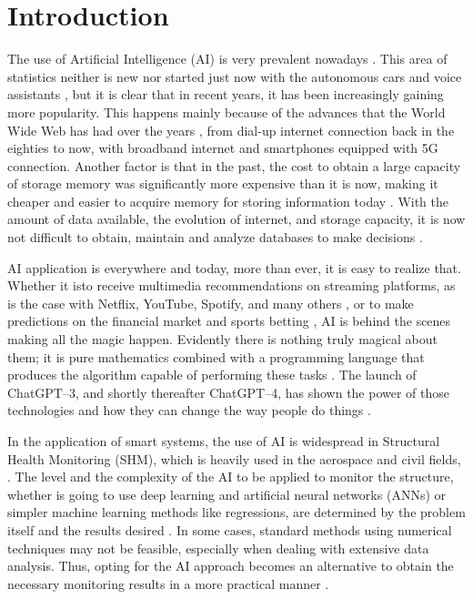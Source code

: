 \chapter{Introduction}

The use of Artificial Intelligence (AI) is very prevalent nowadays \cite{lee2020,poola2017,rabunal2006}. 
This area of statistics neither is new nor started just now with the autonomous cars and voice assistants \cite{muthukrishnan2020}, but it is clear that in recent years, it has been increasingly gaining more popularity. 
This happens mainly because of the advances that the World Wide Web has had over the years \cite{leiner2009,cohen-almagor2011}, from dial-up internet connection back in the eighties to now, with broadband internet and smartphones equipped with 5G connection. 
Another factor is that in the past, the cost to obtain a large capacity of storage memory was significantly more expensive than it is now, making it cheaper and easier to acquire memory for storing information today \cite{goda2012}. 
With the amount of data available, the evolution of internet, and storage capacity, it is now not difficult to obtain, maintain and analyze databases to make decisions \cite{duan2019}.

AI application is everywhere and today, more than ever, it is easy to realize that. 
Whether it isto receive multimedia recommendations on streaming platforms, as is the case with Netflix, YouTube, Spotify, and many others \cite{chan-olmsted2019}, or to make predictions on the financial market and sports betting \cite{milana2021,kollar2021,hubacek2019}, AI is behind the scenes making all the magic happen. 
Evidently there is nothing truly magical about them; it is pure mathematics combined with a programming language that produces the algorithm capable of performing these tasks \cite{goodfellow2016,aurelien2022,raschka2015,raschka2022}.
The launch of ChatGPT--3, and shortly thereafter ChatGPT--4, has shown the power of those technologies and how they can change the way people do things \cite{biswas2023,biswas2023a, lund2023,baidoo-anu2023}.

In the application of smart systems, the use of AI is widespread in Structural Health Monitoring (SHM), which is heavily used in the aerospace and civil fields, \cite{azimi2020,ye2019}. 
The level and the complexity of the AI to be applied to monitor the structure, whether is going to use deep learning and artificial neural networks (ANNs) or simpler machine learning methods like regressions, are determined by the problem itself and the results desired \cite{farrar2012}. 
In some cases, standard methods using numerical techniques may not be feasible, especially when dealing with extensive data analysis. 
Thus, opting for the AI approach becomes an alternative to obtain the necessary monitoring results in a more practical manner \cite{smarsly2007,sun2020}. 

